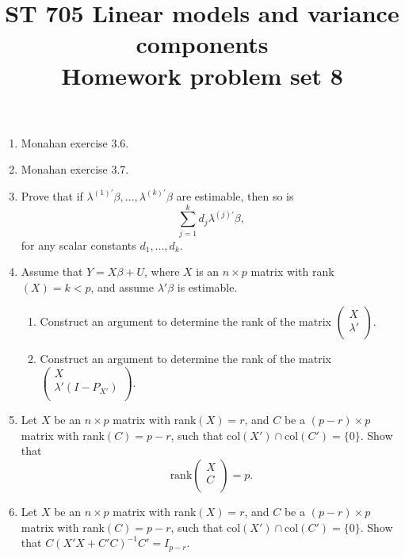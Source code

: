 \documentclass[11pt]{article}
\title{ST 705 Linear models and variance components \\ 
        Homework problem set 8}
\begin{document}
\maketitle

\begin{enumerate}

\item Monahan exercise 3.6.

\item Monahan exercise 3.7.

\item Prove that if $\lambda^{(1)'}\beta,\dots,\lambda^{(k)'}\beta$ are estimable, then so is 
\[
\sum_{j=1}^{k}d_{j}\lambda^{(j)'}\beta,
\]
for any scalar constants $d_{1},\dots,d_{k}$.

\item Assume that $Y = X\beta + U$, where $X$ is an $n\times p$ matrix with rank$(X) = k < p$, and assume $\lambda'\beta$ is estimable.
\begin{enumerate}
\item Construct an argument to determine the rank of the matrix 
$
\begin{pmatrix}
X \\
\lambda' \\
\end{pmatrix}
$.
\item Construct an argument to determine the rank of the matrix  
$
\begin{pmatrix}
X \\
\lambda'(I - P_{X'}) \\
\end{pmatrix}
$.
\end{enumerate}

\item Let $X$ be an $n\times p$ matrix with rank$(X) = r$, and $C$ be a $(p-r)\times p$ matrix with rank$(C) = p-r$, such that col$(X') \cap \text{col}(C') = \{0\}$.  Show that 
\[
\text{rank}
\begin{pmatrix}
X \\
C \\
\end{pmatrix} = p.
\]

\item  Let $X$ be an $n\times p$ matrix with rank$(X) = r$, and $C$ be a $(p-r)\times p$ matrix with rank$(C) = p-r$, such that col$(X') \cap \text{col}(C') = \{0\}$.  Show that $C(X'X + C'C)^{-1}C' = I_{p-r}$.



\end{enumerate}
\end{document}
